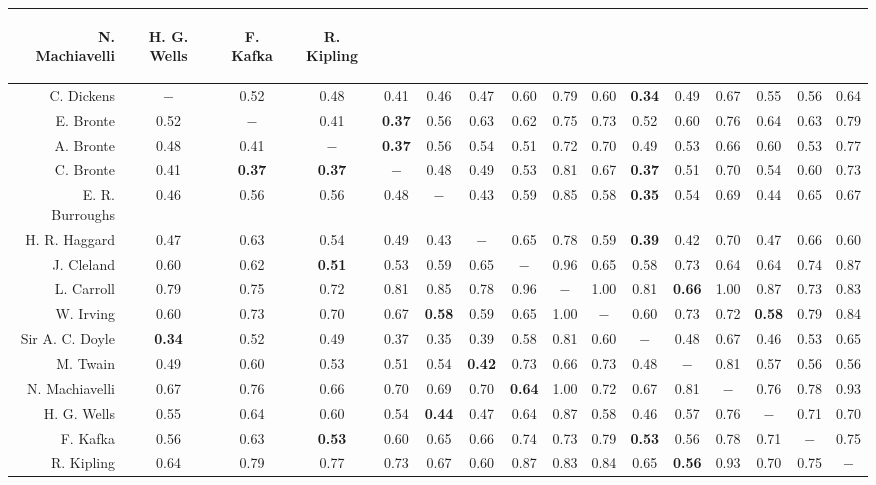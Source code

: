 \documentclass[conference]{IEEEtran}
\begin{document}
\begin{table}
\begin{center}
\begin{tabular}{r|ccccccccccccccc}
\begin{sideways}
N. Machiavelli
\end{sideways} & \begin{sideways}
H. G. Wells
\end{sideways} & \begin{sideways}
F. Kafka
\end{sideways} & \begin{sideways}
R. Kipling
\end{sideways}\tabularnewline
\hline 
C. Dickens & $-$ & 0.52 & 0.48 & 0.41 & 0.46 & 0.47 & 0.60 & 0.79 & 0.60 & \textbf{0.34} & 0.49 & 0.67 & 0.55 & 0.56 & 0.64 \\
E. Bronte & 0.52 & $-$ & 0.41 & \textbf{0.37} & 0.56 & 0.63 & 0.62 & 0.75 & 0.73 & 0.52 & 0.60 & 0.76 & 0.64 & 0.63 & 0.79 \\
A. Bronte & 0.48 & 0.41 & $-$ & \textbf{0.37} & 0.56 & 0.54 & 0.51 & 0.72 & 0.70 & 0.49 & 0.53 & 0.66 & 0.60 & 0.53 & 0.77 \\
C. Bronte & 0.41 & \textbf{0.37} & \textbf{0.37} & $-$ & 0.48 & 0.49 & 0.53 & 0.81 & 0.67 & \textbf{0.37} & 0.51 & 0.70 & 0.54 & 0.60 & 0.73 \\
E. R. Burroughs & 0.46 & 0.56 & 0.56 & 0.48 & $-$ & 0.43 & 0.59 & 0.85 & 0.58 & \textbf{0.35} & 0.54 & 0.69 & 0.44 & 0.65 & 0.67 \\
H. R. Haggard & 0.47 & 0.63 & 0.54 & 0.49 & 0.43 & $-$ & 0.65 & 0.78 & 0.59 & \textbf{0.39} & 0.42 & 0.70 & 0.47 & 0.66 & 0.60 \\
J. Cleland & 0.60 & 0.62 & \textbf{0.51} & 0.53 & 0.59 & 0.65 & $-$ & 0.96 & 0.65 & 0.58 & 0.73 & 0.64 & 0.64 & 0.74 & 0.87 \\
L. Carroll & 0.79 & 0.75 & 0.72 & 0.81 & 0.85 & 0.78 & 0.96 & $-$ & 1.00 & 0.81 & \textbf{0.66} & 1.00 & 0.87 & 0.73 & 0.83 \\
W. Irving & 0.60 & 0.73 & 0.70 & 0.67 & \textbf{0.58} & 0.59 & 0.65 & 1.00 & $-$ & 0.60 & 0.73 & 0.72 & \textbf{0.58} & 0.79 & 0.84 \\
Sir A. C. Doyle & \textbf{0.34} & 0.52 & 0.49 & 0.37 & 0.35 & 0.39 & 0.58 & 0.81 & 0.60 & $-$ & 0.48 & 0.67 & 0.46 & 0.53 & 0.65 \\
M. Twain & 0.49 & 0.60 & 0.53 & 0.51 & 0.54 & \textbf{0.42} & 0.73 & 0.66 & 0.73 & 0.48 & $-$ & 0.81 & 0.57 & 0.56 & 0.56 \\
N. Machiavelli & 0.67 & 0.76 & 0.66 & 0.70 & 0.69 & 0.70 & \textbf{0.64} & 1.00 & 0.72 & 0.67 & 0.81 & $-$ & 0.76 & 0.78 & 0.93 \\
H. G. Wells & 0.55 & 0.64 & 0.60 & 0.54 & \textbf{0.44} & 0.47 & 0.64 & 0.87 & 0.58 & 0.46 & 0.57 & 0.76 & $-$ & 0.71 & 0.70 \\
F. Kafka & 0.56 & 0.63 & \textbf{0.53} & 0.60 & 0.65 & 0.66 & 0.74 & 0.73 & 0.79 & \textbf{0.53} & 0.56 & 0.78 & 0.71 & $-$ & 0.75 \\
R. Kipling & 0.64 & 0.79 & 0.77 & 0.73 & 0.67 & 0.60 & 0.87 & 0.83 & 0.84 & 0.65 & \textbf{0.56} & 0.93 & 0.70 & 0.75 & $-$ \\
\end{tabular}
\end{center}
\end{table} 
\end{document}
